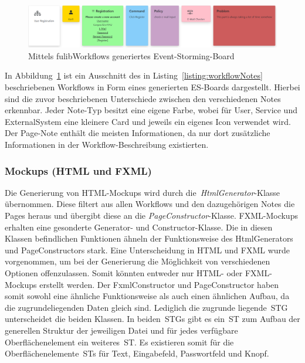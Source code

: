 \begin{figure}[h]
    \centering
    \includegraphics[width=1.0\textwidth]{images/3.1.4/board}
    \caption{Mittels fulibWorkflows generiertes Event-Storming-Board}
    \label{fig:generated-board}
\end{figure}

In Abbildung~\ref{fig:generated-board} ist ein Ausschnitt des in Listing~\ref{listing:workflowNotes} beschriebenen Workflows in
Form eines generierten \ac{ES}-Boards dargestellt.
Hierbei sind die zuvor beschriebenen Unterschiede zwischen den verschiedenen Notes erkennbar.
Jeder Note-Typ besitzt eine eigene Farbe, wobei für User, Service und ExternalSystem eine kleinere Card und jeweils ein
eigenes Icon verwendet wird.
Der Page-Note enthält die meisten Informationen, da nur dort zusätzliche Informationen in der Workflow-Beschreibung existierten.

\subsubsection{Mockups (HTML und FXML)}\label{subsubsec:mockups-html/fxml}
Die Generierung von HTML-Mockups wird durch die~\textit{HtmlGenerator}-Klasse übernommen.
Diese filtert aus allen Workflows und den dazugehörigen Notes die Pages heraus und übergibt diese an die \textit{PageConstructor}-Klasse.
FXML-Mockups erhalten eine gesonderte Generator- und Constructor-Klasse.
Die in diesen Klassen befindlichen Funktionen ähneln der Funktionsweise des HtmlGenerators und PageConstructors stark.
Eine Unterscheidung in HTML und FXML wurde vorgenommen, um bei der Generierung die Möglichkeit von verschiedenen Optionen offenzulassen.
Somit könnten entweder nur HTML- oder FXML-Mockups erstellt werden.
Der FxmlConstructor und PageConstructor haben somit sowohl eine ähnliche Funktionsweise als auch einen ähnlichen Aufbau, da die zugrundeliegenden Daten gleich sind.
Lediglich die zugrunde liegende~\ac{STG} unterscheidet die beiden Klassen.
In beiden~\acp{STG} gibt es ein~\ac{ST} zum Aufbau der generellen Struktur der jeweiligen Datei und für jedes verfügbare Oberflächenelement ein weiteres~\ac{ST}.
Es existieren somit für die Oberflächenelemente~\acp{ST} für Text, Eingabefeld, Passwortfeld und Knopf.

